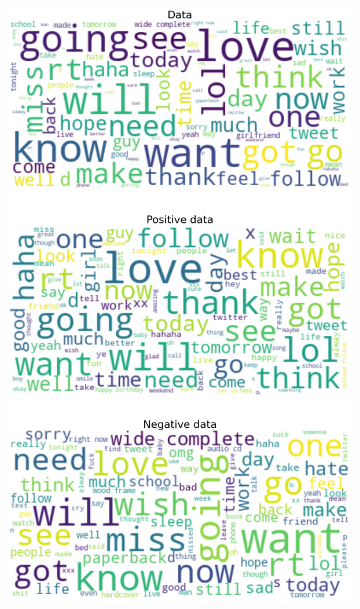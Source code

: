 \documentclass{article}
\begin{document}
\begin{itemize}
\begin{figure}[H]
\begin{subfigure}[b]{0.24\textwidth}
      \includegraphics[width=\textwidth]{chapter-06/section-01-01/15/visualization/2/wordcloud.png}
    \end{subfigure}
      \begin{subfigure}[b]{0.24\textwidth}
      \centering

\end{subfigure}
\end{figure}
\end{itemize}
\end{document}
